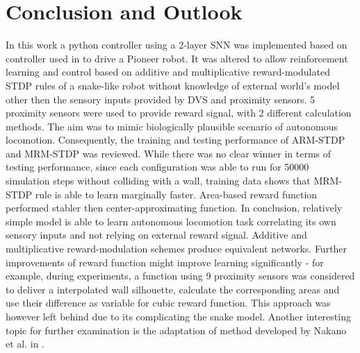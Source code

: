 
\chapter{Conclusion and Outlook}\label{chapter:conclusion}

In this work a python controller using a 2-layer SNN was implemented based on controller used in \cite{1} to drive a Pioneer robot. It was altered to allow reinforcement learning and control based on additive and multiplicative reward-modulated STDP rules of a snake-like robot without knowledge of external world's model other then the sensory inputs provided by DVS and proximity sensors. 5 proximity sensors were used to provide reward signal, with 2 different calculation methods. The aim was to mimic biologically plausible scenario of autonomous locomotion. Consequently, the training and testing performance of ARM-STDP and MRM-STDP was reviewed. While there was no clear winner in terms of testing performance, since each configuration was able to run for 50000 simulation steps without colliding with a wall, training data shows that MRM-STDP rule is able to learn marginally faster. Area-based reward function performed stabler then center-approximating function. In conclusion, relatively simple model is able to learn autonomous locomotion task correlating its own sensory inputs and not relying on external reward signal. Additive and multiplicative reward-modulation schemes produce equivalent networks. Further improvements of reward function might improve learning significantly - for example, during experiments, a function using 9 proximity sensors was considered to deliver a interpolated wall silhouette, calculate the corresponding areas and use their difference as variable for cubic reward function. This approach was however left behind due to its complicating the snake model. Another interesting topic for further examination is the adaptation of method developed by Nakano et al. in \cite{20}. 